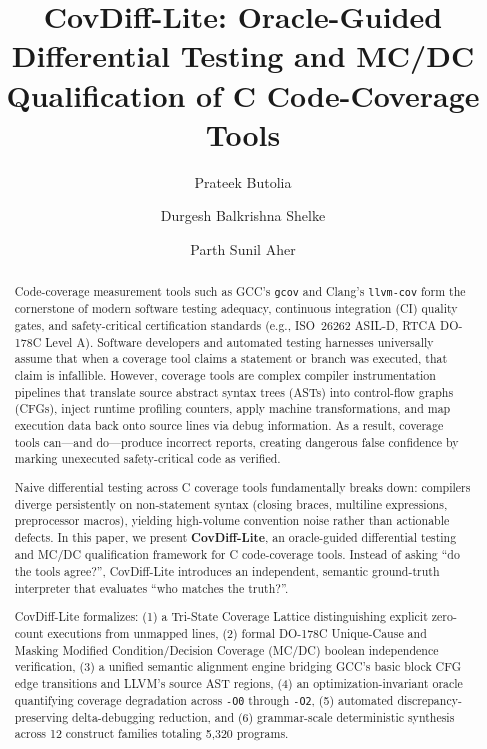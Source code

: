 \documentclass[sigconf,review,anonymous=false]{acmart}
\theoremstyle{definition}
\begin{document}
\title{CovDiff-Lite: Oracle-Guided Differential Testing and MC/DC Qualification of C Code-Coverage Tools}

\author{Prateek Butolia}

\author{Durgesh Balkrishna Shelke}

\author{Parth Sunil Aher}

\begin{abstract}
Code-coverage measurement tools such as GCC's \texttt{gcov} and Clang's \texttt{llvm-cov} form the cornerstone of modern software testing adequacy, continuous integration (CI) quality gates, and safety-critical certification standards (e.g., ISO~26262 ASIL-D, RTCA DO-178C Level A). Software developers and automated testing harnesses universally assume that when a coverage tool claims a statement or branch was executed, that claim is infallible. However, coverage tools are complex compiler instrumentation pipelines that translate source abstract syntax trees (ASTs) into control-flow graphs (CFGs), inject runtime profiling counters, apply machine transformations, and map execution data back onto source lines via debug information. As a result, coverage tools can—and do—produce incorrect reports, creating dangerous false confidence by marking unexecuted safety-critical code as verified.

Naive differential testing across C coverage tools fundamentally breaks down: compilers diverge persistently on non-statement syntax (closing braces, multiline expressions, preprocessor macros), yielding high-volume convention noise rather than actionable defects. In this paper, we present \textbf{CovDiff-Lite}, an oracle-guided differential testing and MC/DC qualification framework for C code-coverage tools. Instead of asking ``do the tools agree?'', CovDiff-Lite introduces an independent, semantic ground-truth interpreter that evaluates ``who matches the truth?''.

CovDiff-Lite formalizes: (1) a Tri-State Coverage Lattice distinguishing explicit zero-count executions from unmapped lines, (2) formal DO-178C Unique-Cause and Masking Modified Condition/Decision Coverage (MC/DC) boolean independence verification, (3) a unified semantic alignment engine bridging GCC's basic block CFG edge transitions and LLVM's source AST regions, (4) an optimization-invariant oracle quantifying coverage degradation across \texttt{-O0} through \texttt{-O2}, (5) automated discrepancy-preserving delta-debugging reduction, and (6) grammar-scale deterministic synthesis across 12 construct families totaling 5,320 programs.


\end{abstract}
\end{document}
